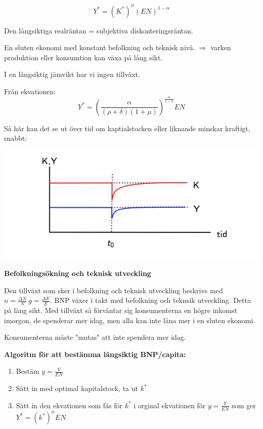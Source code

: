 \documentclass{article}
\begin{document}
$$
Y^* = (K^*)^{\alpha}(EN)^{1-\alpha}
$$

Den långsiktiga realräntan = subjektiva diskonteringsräntan.
\par
En sluten ekonomi med konstant befolkning och teknisk nivå. $ \Rightarrow $ varken produktion eller konsumtion kan växa på lång sikt. \par

I en långsiktig jämvikt har vi ingen tillväxt. 

Från ekvationen: 
$$
Y^* = (\frac{\alpha}{(\rho+\delta)(1+\mu)})^{\frac{\alpha}{1-\alpha}}EN
$$

Så här kan det se ut över tid om kaptialstocken eller liknande minskar kraftigt, snabbt: 


\includegraphics[scale=0.6]{skarm3}

\textbf{Befolkningsökning och teknisk utveckling} \par \noindent Den tillväxt som sker i befolkning och teknisk utveckling beskrivs med $ n = \frac{\Delta N}{N} \ g =  \frac{\Delta E}{E} $. BNP växer i takt med befolkning och teknsik utveckling. Detta på lång sikt. Med tillväxt så förväntar sig konsumenterna en högre inkomst imorgon, de spenderar mer idag, men alla kan inte låna mer i en sluten ekonomi. \par \noindent Konsumenterna måste "mutas" att inte spendera mer idag. \par

\textbf{Algoritm för att bestämma långsiktig BNP/capita: }
\begin{enumerate}
 \item Bestäm $ y = \frac{Y}{EN} $
 \item Sätt in med optimal kapitalstock, ta ut $ k^* $
 \item Sätt in den ekvationen som fås för $ k^* $ i orginal ekvationen för $ y = \frac{Y}{EN} $ som ger $ Y^* = (k^*)^{\alpha}EN $
\end{enumerate}
\end{document}
